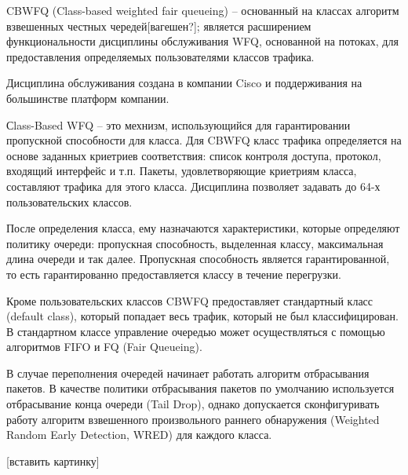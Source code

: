     CBWFQ (Class-based weighted fair queueing) -- основанный на классах алгоритм взвешенных честных
    чередей[вагешен?]; является расширением функциональности дисциплины обслуживания WFQ,
	основанной на потоках, для предоставления определяемых пользователями классов трафика. 

	Дисциплина обслуживания создана в компании Cisco и поддерживания на большинстве
	платформ компании. 

	Сlass-Based WFQ -- это мехнизм, использующийся для гарантировании пропускной способности
	для класса. Для CBWFQ класс трафика определяется на основе заданных криетриев
	соответствия: список контроля доступа, протокол, входящий интерфейс и т.п. Пакеты,
	удовлетворяющие криетриям класса, составляют трафика для этого класса. Дисциплина
	позволяет задавать до 64-х пользовательских классов.

	После определения класса, ему назначаются характеристики, которые определяют
	политику очереди: пропускная способность, выделенная классу, максимальная
	длина очереди и так далее. Пропускная способность является гарантированной,
	то есть гарантированно предоставляется классу в течение перегрузки. 

	Кроме пользовательских классов CBWFQ предоставляет стандартный класс (default class),
	который попадает весь трафик, который не был классифицирован. В стандартном классе
	управление очередью может осуществляться с помощью алгоритмов FIFO и FQ (Fair Queueing). 

	В случае переполнения очередей начинает работать алгоритм отбрасывания пакетов.
	В качестве политики отбрасывания пакетов по умолчанию используется отбрасывание конца
	очереди (Tail Drop), однако допускается сконфигуривать работу
	алгоритм взвешенного произвольного раннего обнаружения (Weighted Random Early Detection, WRED)
	для каждого класса.

	
    [вставить картинку]




